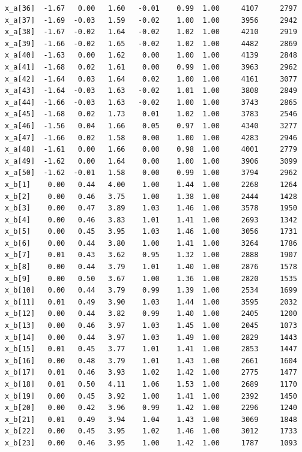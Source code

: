 \documentclass[american,]{article}
\begin{document}
\begin{verbatim}
x_a[36]  -1.67   0.00   1.60   -0.01    0.99  1.00     4107     2797
x_a[37]  -1.69  -0.03   1.59   -0.02    1.00  1.00     3956     2942
x_a[38]  -1.67  -0.02   1.64   -0.02    1.02  1.00     4210     2919
x_a[39]  -1.66  -0.02   1.65   -0.02    1.02  1.00     4482     2869
x_a[40]  -1.63   0.00   1.62    0.00    1.00  1.00     4139     2848
x_a[41]  -1.68   0.02   1.61    0.00    0.99  1.00     3963     2962
x_a[42]  -1.64   0.03   1.64    0.02    1.00  1.00     4161     3077
x_a[43]  -1.64  -0.03   1.63   -0.02    1.01  1.00     3808     2849
x_a[44]  -1.66  -0.03   1.63   -0.02    1.00  1.00     3743     2865
x_a[45]  -1.68   0.02   1.73    0.01    1.02  1.00     3783     2546
x_a[46]  -1.56   0.04   1.66    0.05    0.97  1.00     4340     3277
x_a[47]  -1.66   0.02   1.58    0.00    1.00  1.00     4283     2946
x_a[48]  -1.61   0.00   1.66    0.00    0.98  1.00     4001     2779
x_a[49]  -1.62   0.00   1.64    0.00    1.00  1.00     3906     3099
x_a[50]  -1.62  -0.01   1.58    0.00    0.99  1.00     3794     2962
x_b[1]    0.00   0.44   4.00    1.00    1.44  1.00     2268     1264
x_b[2]    0.00   0.46   3.75    1.00    1.38  1.00     2444     1428
x_b[3]    0.00   0.47   3.89    1.03    1.46  1.00     3578     1950
x_b[4]    0.00   0.46   3.83    1.01    1.41  1.00     2693     1342
x_b[5]    0.00   0.45   3.95    1.03    1.46  1.00     3056     1731
x_b[6]    0.00   0.44   3.80    1.00    1.41  1.00     3264     1786
x_b[7]    0.01   0.43   3.62    0.95    1.32  1.00     2888     1907
x_b[8]    0.00   0.44   3.79    1.01    1.40  1.00     2876     1578
x_b[9]    0.00   0.50   3.67    1.00    1.36  1.00     2820     1535
x_b[10]   0.00   0.44   3.79    0.99    1.39  1.00     2534     1699
x_b[11]   0.01   0.49   3.90    1.03    1.44  1.00     3595     2032
x_b[12]   0.00   0.44   3.82    0.99    1.40  1.00     2405     1200
x_b[13]   0.00   0.46   3.97    1.03    1.45  1.00     2045     1073
x_b[14]   0.00   0.44   3.97    1.03    1.49  1.00     2829     1443
x_b[15]   0.01   0.45   3.77    1.01    1.41  1.00     2853     1447
x_b[16]   0.00   0.48   3.79    1.01    1.43  1.00     2661     1604
x_b[17]   0.01   0.46   3.93    1.02    1.42  1.00     2775     1477
x_b[18]   0.01   0.50   4.11    1.06    1.53  1.00     2689     1170
x_b[19]   0.00   0.45   3.92    1.00    1.41  1.00     2392     1450
x_b[20]   0.00   0.42   3.96    0.99    1.42  1.00     2296     1240
x_b[21]   0.01   0.49   3.94    1.04    1.43  1.00     3069     1848
x_b[22]   0.00   0.45   3.95    1.02    1.46  1.00     3012     1733
x_b[23]   0.00   0.46   3.95    1.00    1.42  1.00     1787     1093

\end{verbatim}
\end{document}
